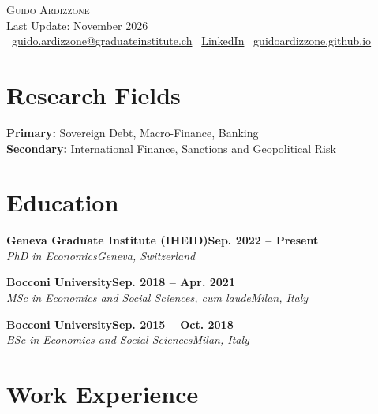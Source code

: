\documentclass[letterpaper,11pt]{article}
\newcommand{\iconmail}{\faEnvelope\ }%
\newcommand{\iconlinkedin}{\faLinkedin\ }%
\newcommand{\iconweb}{\faGlobe\ }%
\newcommand{\iconmail}{}%
\newcommand{\iconlinkedin}{}%
\newcommand{\iconweb}{}%
\newcommand{\cventry}[4]{%
    \textbf{#1}\hfill\textbf{#2}\\
    {\small\textit{#3}}\hfill{\small\textit{#4}}\par\vspace{5pt}}
\begin{document}
\begin{center}
    {\Huge\scshape\textcolor{cvblue}{Guido Ardizzone}}\\[6pt]
    {\small Last Update: November 2026}\\[3pt]
    {\small
    \iconmail\href{mailto:guido.ardizzone@graduateinstitute.ch}{guido.ardizzone@graduateinstitute.ch}
    \quad\textperiodcentered\quad
    \iconlinkedin\href{https://www.linkedin.com/in/guido-ardizzone-b52048174/}{LinkedIn}
    \quad\textperiodcentered\quad
    \iconweb\href{https://guidoardizzone.github.io}{guidoardizzone.github.io}}
\end{center}
\vspace{-6pt}

\section*{Research Fields}

\textbf{Primary:} Sovereign Debt, Macro-Finance, Banking\\[2pt]
\textbf{Secondary:} International Finance, Sanctions and Geopolitical Risk

\section*{Education}

\cventry{Geneva Graduate Institute (IHEID)}{Sep. 2022 -- Present}{PhD in Economics}{Geneva, Switzerland}
\vspace{-4pt}{\small Supervisor: Ugo Panizza. Second reader: Rui Esteves.}\par\vspace{6pt}

\cventry{Bocconi University}{Sep. 2018 -- Apr. 2021}{MSc in Economics and Social Sciences, cum laude}{Milan, Italy}

\cventry{Bocconi University}{Sep. 2015 -- Oct. 2018}{BSc in Economics and Social Sciences}{Milan, Italy}

\section*{Work Experience}
\end{document}
